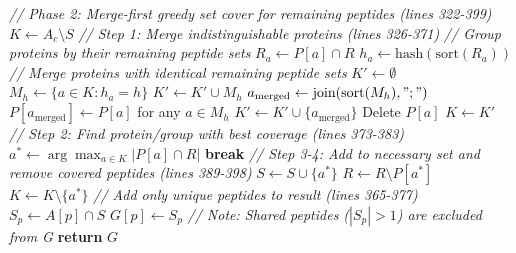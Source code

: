 \documentclass{article}
\begin{document}
\begin{algorithm}[H]
\begin{algorithmic}[1]
    \State \textit{// Phase 2: Merge-first greedy set cover for remaining peptides (lines 322-399)}
    \State $K \gets A_c \setminus S$ 
        \State \textit{// Step 1: Merge indistinguishable proteins (lines 326-371)}
        \State \textit{// Group proteins by their remaining peptide sets}
            \State $R_a \gets P[a] \cap R$ 
            \State $h_a \gets \text{hash}(\text{sort}(R_a))$ 
        \EndFor
        \State \textit{// Merge proteins with identical remaining peptide sets}
        \State $K' \gets \emptyset$ 
            \State $M_h \gets \{a \in K : h_a = h\}$ 
                \State $K' \gets K' \cup M_h$ 
            \Else
                \State $a_{\text{merged}} \gets \text{join}(\text{sort}(M_h), ";")$ 
                \State $P[a_{\text{merged}}] \gets P[a]$ for any $a \in M_h$ 
                \State $K' \gets K' \cup \{a_{\text{merged}}\}$
                    \State Delete $P[a]$ 
                \EndFor
            \EndIf
        \EndFor
        \State $K \gets K'$ 
        \State
        \State \textit{// Step 2: Find protein/group with best coverage (lines 373-383)}
        \State $a^* \gets \arg\max_{a \in K} |P[a] \cap R|$ 
            \State \textbf{break} 
        \EndIf
        \State
        \State \textit{// Step 3-4: Add to necessary set and remove covered peptides (lines 389-398)}
        \State $S \gets S \cup \{a^*\}$ 
        \State $R \gets R \setminus P[a^*]$ 
        \State $K \gets K \setminus \{a^*\}$ 
    \EndWhile
    \State
    \State \textit{// Add only unique peptides to result (lines 365-377)}
        \State $S_p \gets A[p] \cap S$ 
            \State $G[p] \gets S_p$ 
        \EndIf
        \State \textit{// Note: Shared peptides ($|S_p| > 1$) are excluded from G}
    \EndFor
\EndFor
\State
\State \textbf{return} $G$ 
\end{algorithmic}
\end{algorithm}
\end{document}
